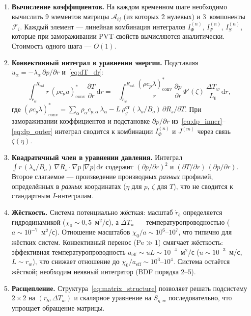 \documentclass[12pt,a4paper]{article}
\newcommand{\dd}{\mathrm{d}}
\newcommand{\pp}{\partial}
\newcommand{\ext}{\mathrm{ext}}
\newcommand{\eff}{\mathrm{eff}}
\newcommand{\st}{\text{ст}}
\begin{document}
\begin{enumerate}[nosep]
  \item \textbf{Вычисление коэффициентов.}
        На каждом временном шаге необходимо вычислить 9 элементов
        матрицы $\mathcal{A}_{ij}$ (из которых 2 нулевых)
        и 3~компоненты $\mathcal{F}_i$. Каждый элемент ---
        линейная комбинация интегралов $I_\Phi^{(n)}$,
        $I_\Psi^{(n)}$, $I_S^{(n)}$, которые при замораживании
        PVT-свойств вычисляются аналитически.
        Стоимость одного шага --- $O(1)$.

  \item \textbf{Конвективный интеграл в уравнении энергии.}
        Подставляя $u_\alpha = -\lambda_\alpha\,\pp p/\pp r$
        и~\eqref{eq:dT_dr}:
        \[
          \int_{r_w}^{R_\ext} r\,(\rho c_p u)_\mathrm{conv}^*\,
            \frac{\pp T}{\pp r}\,\dd r
          = -\int_{r_w}^{R_\ext}
            \frac{(\rho c_p \lambda)_\mathrm{conv}^*}{r}\,
            \frac{\pp p}{\pp r}\,
            \Psi'(\zeta)\,\frac{\Delta T_w}{L_0}\,\dd r,
        \]
        где $(\rho c_p \lambda)_\mathrm{conv}^*
        = \sum_\alpha \rho_\alpha c_{p,\alpha}\,\lambda_\alpha
          - L\,\rho_g^\st\,(\lambda_o/B_o)\,\pp R_s/\pp T$.
        При замораживании коэффициентов и подстановке
        $\pp p/\pp r$ из~\eqref{eq:dp_inner}--\eqref{eq:dp_outer}
        интеграл сводится к комбинации $I_\Phi^{(n)}$
        и $J^{(m)}$ через связь $\zeta(\eta)$.

  \item \textbf{Квадратичный член в уравнении давления.}
        Интеграл $\int r\,(\lambda_o/B_o)\,\nabla R_s\cdot\nabla p\,
        |\nabla p|\,\dd r$ содержит $(\pp p/\pp r)^2$ и
        $(\pp T/\pp r)\,(\pp p/\pp r)$. Второе слагаемое ---
        произведение производных \emph{разных} профилей,
        определённых в \emph{разных} координатах
        ($\eta$ для $p$, $\zeta$ для $T$), что не сводится
        к стандартным $I$-интегралам.

  \item \textbf{Жёсткость.}
        Система потенциально жёсткая: масштаб $\dot{r}_b$
        определяется гидродинамикой ($\chi_0 \sim 0{,}5$~м$^2$/с),
        а $\dot{\Delta T}_w$ --- температуропроводностью
        ($a \sim 10^{-7}$~м$^2$/с). Отношение масштабов
        $\chi_0/a \sim 10^6$--$10^7$, что типично
        для жёстких систем.
        Конвективный перенос ($\mathrm{Pe} \gg 1$) смягчает
        жёсткость: эффективная температуропроводность
        $a_\eff \sim uL \sim 10^{-4}$~м$^2$/с
        ($u \sim 10^{-3}$~м/с, $L \sim r_w$), что
        снижает отношение до $\chi_0/a_\eff \sim 10^3$--$10^4$.
        Система остаётся жёсткой; необходим неявный
        интегратор (BDF порядка 2--5).

  \item \textbf{Расщепление.}
        Структура~\eqref{eq:matrix_structure} позволяет
        решать подсистему $2\times 2$ на $(r_b, \Delta T_w)$
        и скалярное уравнение на $S_{g,w}$ последовательно,
        что упрощает обращение матрицы.
\end{enumerate}
\end{document}
